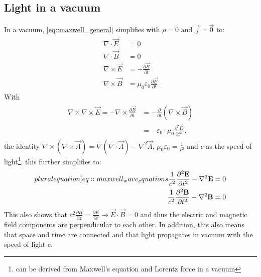 \subsection{Light in a vacuum}
%
In a vacuum, \cref{eq::maxwell_general} simplifies with $\rho = 0$ and $\vec{j} = \vec{0}$ to:
%
\begin{align}
\begin{split} \label{eq::maxwell_vacuum}
  \nabla \cdot \vec{E} &= 0 \quad\\
  \nabla \cdot \vec{B} &= 0 \quad\\
  \nabla \times \vec{E} &= -\frac{\partial\vec B}{\partial t}\\
  \nabla \times \vec{B} &= \mu_0\varepsilon_0 \frac{\partial\vec E}{\partial t}
  \end{split}
\end{align}
%
With
\begin{align}
\begin{split}
    \nabla \times \nabla \times \vec{E} = -\nabla \times \frac{\partial \vec{B}} {\partial t} &= -\frac{\partial} {\partial t} \left( \nabla \times  \vec{B} \right)\\
    &= -\varepsilon_0 \cdot \mu_0 \frac{\partial^2 \vec{E}}{\partial t^2} \, ,
\end{split}
\end{align}
%
the identity $\nabla \times \left( \nabla \times \vec{A} \right) = \nabla(\nabla \cdot \vec{A}) - \nabla^{2}\vec{A}$, $\mu_0\varepsilon_0 = \frac{1}{c^2}$ and $c$ as the speed of light\footnote{can be derived from Maxwell's equation and Lorentz force in a vacuum}, this further simplifies to:
%
\begin{align}
\begin{split} \label[pluralequation]{eq::maxwell_wave_equations}
  \frac{1}{c^2} \frac{\partial^2 \vec{E}}{\partial t^2} - \nabla^2 \vec{E} &= 0 \\
  \frac{1}{c^2} \frac{\partial^2 \vec{B}}{\partial t^2} - \nabla^2 \vec{B} &= 0
\end{split}
\end{align}
%
This also shows that $c^2 \frac{\partial B} {\partial z} = \frac{\partial E}{\partial t} \rightarrow \vec{E} \cdot \vec{B} = 0$ and thus the electric and magnetic field components are perpendicular to each other.
In addition, this also means that space and time are connected and that light propagates in vacuum with the speed of light $c$.
%
